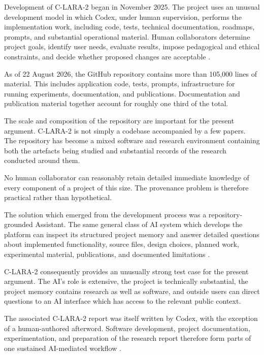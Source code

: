 \documentclass[12pt]{article}
\begin{document}
Development of C-LARA-2 began in November 2025. The project uses an unusual development model in which Codex, under human supervision, performs the implementation work, including code, tests, technical documentation, roadmaps, prompts, and substantial operational material. Human collaborators determine project goals, identify user needs, evaluate results, impose pedagogical and ethical constraints, and decide whether proposed changes are acceptable \citep[Section~2.4]{bediEtAl2026clara2}.

As of 22 August 2026, the GitHub repository contains more than 105,000 lines of material. This includes application code, tests, prompts, infrastructure for running experiments, documentation, and publications. Documentation and publication material together account for roughly one third of the total.

The scale and composition of the repository are important for the present argument. C-LARA-2 is not simply a codebase accompanied by a few papers. The repository has become a mixed software and research environment containing both the artefacts being studied and substantial records of the research conducted around them.

No human collaborator can reasonably retain detailed immediate knowledge of every component of a project of this size. The provenance problem is therefore practical rather than hypothetical.

The solution which emerged from the development process was a repository-grounded Assistant. The same general class of AI system which develops the platform can inspect its structured project memory and answer detailed questions about implemented functionality, source files, design choices, planned work, experimental material, publications, and documented limitations \citep[Section~9]{bediEtAl2026clara2}.

C-LARA-2 consequently provides an unusually strong test case for the present argument. The AI's role is extensive, the project is technically substantial, the project memory contains research as well as software, and outside users can direct questions to an AI interface which has access to the relevant public context.

The associated C-LARA-2 report was itself written by Codex, with the exception of a human-authored afterword. Software development, project documentation, experimentation, and preparation of the research report therefore form parts of one sustained AI-mediated workflow \citep[Abstract]{bediEtAl2026clara2}.
\end{document}
